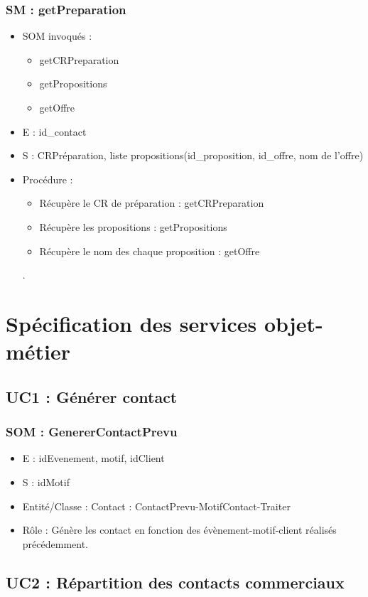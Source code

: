 \subsubsection{SM : getPreparation}
\begin{itemize}
	\item SOM invoqués :
	\begin{itemize}
		\item getCRPreparation
		\item getPropositions
		\item getOffre
	\end{itemize}
	\item E : id\_contact
	\item S : CRPréparation, liste propositions(id\_proposition, id\_offre, nom de l’offre)
	\item Procédure :
	\begin{itemize}
		\item Récupère le CR de préparation : getCRPreparation
		\item Récupère les propositions : getPropositions
		\item Récupère le nom des chaque proposition : getOffre
	\end{itemize}.
\end{itemize}



\section{Spécification des services objet-métier}
\subsection{UC1 : Générer contact}
\subsubsection{SOM : GenererContactPrevu}
	\begin{itemize}
		\item E : idEvenement, motif, idClient
		\item S : idMotif
		\item Entité/Classe : Contact : ContactPrevu-MotifContact-Traiter
		\item Rôle : Génère les contact en fonction des évènement-motif-client réalisés
	précédemment.
	\end{itemize}



\subsection{UC2 : Répartition des contacts commerciaux}
